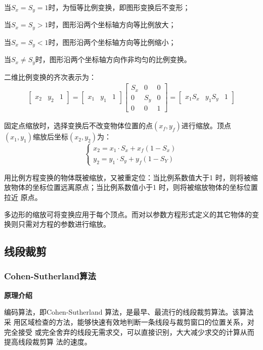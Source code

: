 \documentclass[a4paper,UTF8]{article}
\theoremstyle{definition}
\begin{document}
当$S_x = S_y =1 $时，为恒等比例变换，即图形变换后不变形；

当$S_x = S_y >1 $时，图形沿两个坐标轴方向等比例放大；

当$S_x = S_y <1 $时，图形沿两个坐标轴方向等比例缩小；

当$S_x \neq S_y $时，图形沿两个坐标轴方向作非均匀的比例变换。

二维比例变换的齐次表示为：
\begin{align}
    \begin{bmatrix} x_2 & y_2& 1  \end{bmatrix} = \begin{bmatrix} x_1& y_1& 1  \end{bmatrix}
    \begin{bmatrix} 
        S_x & 0 & 0 \\
        0 & S_y & 0 \\ 
        0 & 0 & 1 
    \end{bmatrix}
    =\begin{bmatrix} x_1S_x & y_1S_y& 1  \end{bmatrix}
\end{align}

固定点缩放时，选择变换后不改变物体位置的点$(x_f,y_f)$进行缩放。顶点$(x_1,y_1)$缩放后坐标$(x_2,y_2)$为：
\begin{equation}
    \left\{
                 \begin{array}{lr}
                 x_2 = x_1\cdot S_x + x_f(1 - S_x)\\
                 y_2 = y_1\cdot S_y + y_f(1-S_Y)
                 \end{array}
    \right.
\end{equation}

用比例方程变换的物体既被缩放，又被重定位：当比例系数值大于1 时，则将被缩
放物体的坐标位置远离原点；当比例系数值小于1 时，则将被缩放物体的坐标位置拉近
原点。



多边形的缩放可将变换应用于每个顶点。而对以参数方程形式定义的其它物体的变
换则只需对方程的参数进行缩放。\cite{move}
\subsection{线段裁剪}
\subsubsection{Cohen-Sutherland算法}
\textbf{原理介绍}\par
编码算法，即Cohen-Sutherland 算法，是最早、最流行的线段裁剪算法。该算法采
用区域检查的方法，能够快速有效地判断一条线段与裁剪窗口的位置关系，对完全接受
或完全舍弃的线段无需求交，可以直接识别，大大减少求交的计算从而提高线段裁剪算
法的速度。
\end{document}
